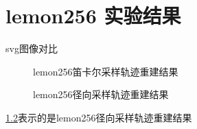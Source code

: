 \chapter{lemon256 实验结果}



svg图像对比
\begin{figure}[H]
    \centering
    
    \caption{lemon256笛卡尔采样轨迹重建结果}
    \label{fig:lemon256 Decartes}
\end{figure}



\begin{figure}[H]
    \centering
    
    \caption{lemon256径向采样轨迹重建结果}
    \label{fig:lemon256 Radial}
\end{figure}

\ref{fig:lemon256 Radial}表示的是lemon256径向采样轨迹重建结果